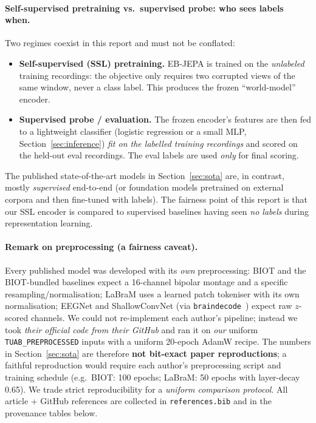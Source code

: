 \documentclass[10pt,a4paper]{article}
\begin{document}
\paragraph{Self-supervised pretraining vs.\ supervised probe: who sees labels when.} Two regimes coexist
in this report and must not be conflated:
\begin{itemize}
  \item \textbf{Self-supervised (SSL) pretraining.} EB-JEPA is trained on the \emph{unlabeled} training
  recordings: the objective only requires two corrupted views of the same window, never a class label. This
  produces the frozen ``world-model'' encoder.
  \item \textbf{Supervised probe / evaluation.} The frozen encoder's features are then fed to a lightweight
  classifier (logistic regression or a small MLP, Section~\ref{sec:inference}) \emph{fit on the labelled
  training recordings} and scored on the held-out eval recordings. The eval labels are used \emph{only} for
  final scoring.
\end{itemize}
The published state-of-the-art models in Section~\ref{sec:sota} are, in contrast, mostly \emph{supervised}
end-to-end (or foundation models pretrained on external corpora and then fine-tuned with labels). The
fairness point of this report is that our SSL encoder is compared to supervised baselines having seen
\emph{no labels} during representation learning.

\paragraph{Remark on preprocessing (a fairness caveat).} Every published model was developed with its
\emph{own} preprocessing: BIOT and the BIOT-bundled baselines expect a 16-channel bipolar montage and a
specific resampling/normalisation; LaBraM uses a learned patch tokeniser with its own normalisation; EEGNet
and ShallowConvNet (via \texttt{braindecode}~\cite{braindecode}) expect raw $z$-scored channels. We could not
re-implement each author's pipeline; instead we took \emph{their official code from their GitHub} and ran it
on \emph{our} uniform \texttt{TUAB\_PREPROCESSED} inputs with a uniform 20-epoch AdamW recipe. The numbers in
Section~\ref{sec:sota} are therefore \textbf{not bit-exact paper reproductions}; a faithful reproduction
would require each author's preprocessing script and training schedule (e.g.\ BIOT: 100 epochs; LaBraM:
50 epochs with layer-decay 0.65). We trade strict reproducibility for a \emph{uniform comparison protocol}.
All article + GitHub references are collected in \texttt{references.bib} and in the provenance tables below.
\end{document}
